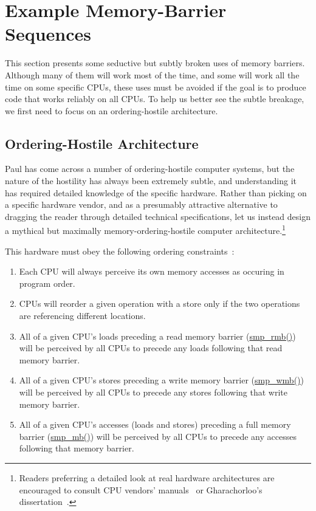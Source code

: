 \section{Example Memory-Barrier Sequences}
\label{sec:app:whymb:Example Memory-Barrier Sequences}

This section presents some seductive but subtly broken uses of
memory barriers.
Although many of them will work most of the time, and some will
work all the time on some specific CPUs, these uses must be avoided
if the goal is to produce code that works reliably on all CPUs.
To help us better see the subtle breakage, we first need to focus
on an ordering-hostile architecture.

\subsection{Ordering-Hostile Architecture}
\label{sec:app:whymb:Ordering-Hostile Architecture}

Paul has come across a number of ordering-hostile computer systems,
but the nature of the hostility has always been extremely subtle,
and understanding it has required detailed knowledge of the specific
hardware.
Rather than picking on a specific hardware vendor, and as a presumably
attractive alternative to dragging the reader through detailed
technical specifications, let us instead design a mythical but maximally
memory-ordering-hostile computer architecture.\footnote{
	Readers preferring a detailed look at real hardware
	architectures are encouraged to consult CPU vendors'
	manuals~\cite{ALPHA95,AMDOpteron02,IntelItanium02v2,PowerPC94,MichaelLyons02a,SPARC94,IntelXeonV3-96a,IntelXeonV2b-96a,IBMzSeries04a} or
	Gharachorloo's dissertation~\cite{Gharachorloo95}.}

This hardware must obey the following ordering
constraints~\cite{PaulMcKenney2005i,PaulMcKenney2005j}:
\begin{enumerate}
\item	Each CPU will always perceive its own memory accesses
	as occuring in program order.
\item	CPUs will reorder a given operation with a store only
	if the two operations are referencing different locations.
\item	All of a given CPU's loads preceding a read memory barrier
	(\url{smp_rmb()}) will be perceived by all CPUs to precede
	any loads following that read memory barrier.
\item	All of a given CPU's stores preceding a write memory barrier
	(\url{smp_wmb()}) will be perceived by all CPUs to precede
	any stores following that write memory barrier.
\item	All of a given CPU's accesses (loads and stores) preceding a
	full memory barrier
	(\url{smp_mb()}) will be perceived by all CPUs to precede
	any accesses following that memory barrier.
\end{enumerate}

